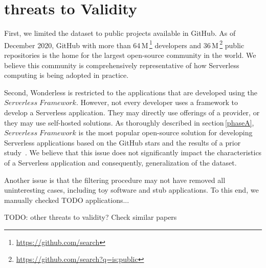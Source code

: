 \section{threats to Validity}
\label{limitations}

%

First, we limited the dataset to public projects available in GitHub. As of December 2020, 
GitHub with more than 64\,M\,\footnote{\url{https://github.com/search}} 
developers and 36\,M\,\footnote{\url{https://github.com/search?q=is:public}} public 
repositories is the home for the largest open-source community in the world. 
We believe this community is comprehensively representative of how Serverless 
computing is being adopted in practice.
%

Second, Wonderless is restricted to the applications 
that are developed using the $Serverless \; Framework$. 
However, not every developer uses a framework to develop a Serverless application. 
They may directly use offerings of a provider, or they may use self-hosted solutions. 
%
As thoroughly 
described in section\,\ref{phaseA}, $Serverless \; Framework$ is the 
most popular open-source solution for developing Serverless applications 
based on the GitHub stars and the results of a prior study~\cite{kritikos2018review}. 
We believe that this issue does not significantly impact the characteristics of a 
Serverless application and consequently, generalization of the dataset.

Another issue is that the filtering procedure may not have removed all 
uninteresting cases, including toy software and stub applications.
To this end, we manually checked TODO applications...

TODO: other threats to validity? Check similar papers







